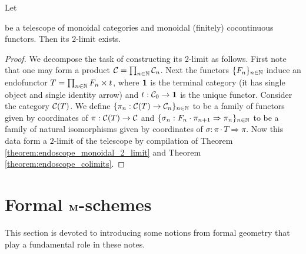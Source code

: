 \begin{corollary}\label{corollary:telescope_2_limits}
Let 
\begin{center}   
\end{center}
be a telescope of monoidal categories and monoidal (finitely) cocontinuous functors. Then its $2$-limit exists.
\end{corollary}
\begin{proof}
We decompose the task of constructing its $2$-limit as follows. First note that one may form a product ${\mathcal C} = \prod_{n\in {\mathbb N}}{\mathcal C}_n$. Next the functors $\{F_n\}_{n\in {\mathbb N}}$ induce an endofunctor $T = \prod_{n\in {\mathbb N}}F_n\times t$, where $\mathbf{1}$ is the terminal category (it has single object and single identity arrow) and $t:{\mathcal C}_0\rightarrow \mathbf{1}$ is the unique functor. Consider the category ${\mathcal C}(T)$. We define $\{\pi_n:{\mathcal C}(T)\rightarrow {\mathcal C}_n\}_{n\in {\mathbb N}}$ to be a family of functors given by coordinates of $\pi:{\mathcal C}(T)\rightarrow {\mathcal C}$ and $\{\sigma_n:F_n\cdot \pi_{n+1}\Rightarrow \pi_n\}_{n\in {\mathbb N}}$ to be a family of natural isomorphisms given by coordinates of $\sigma:\pi\cdot T\Rightarrow \pi$. Now this data form a $2$-limit of the telescope by compilation of Theorem \ref{theorem:endoscope_monoidal_2_limit} and Theorem \ref{theorem:endoscope_colimits}.
\end{proof}

\section{Formal $\mathbf{M}$-schemes}
\noindent
This section is devoted to introducing some notions from formal geometry that play a fundamental role in these notes. 

